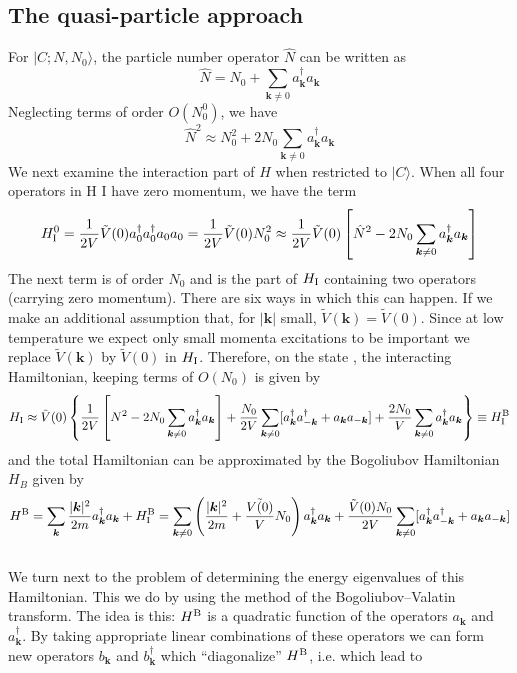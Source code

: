 \subsection{The quasi-particle approach}
For $|C;N,N_0\rangle$, the particle number operator $\hat{N}$ can be written as
\[\hat{N} = N_0 + \sum_{\bm{k}\neq 0}a_{\bm{k}}^{\dagger} a_{\bm{k}} \]
Neglecting terms of order $O(N_0^0)$, we have
\[\hat{N}^2 \approx N_0^2 + 2N_0\sum_{\bm{k}\neq 0}a_{\bm{k}}^{\dagger} a_{\bm{k}} \]
We next examine the interaction part of $H$ when restricted to $|C\rangle$. When all four operators in H I have zero momentum, we have the term
\[H_{\rm I}^0 = \frac{1}{2V} \tilde{V}(0) a^{\dagger}_{0} a^{\dagger}_{0} a_{0} a_{0} = \frac{1}{2V}\tilde{V}(0)N_0^2 \approx  \frac{1}{2V}\tilde{V}(0) \left[\hat{N}^2-2N_0\sum_{\bm{k}\neq 0}a_{\bm{k}}^{\dagger} a_{\bm{k}} \right]\]
The next term is of order $N_0$ and is the part of $H_{\rm I}$ containing two operators (carrying zero momentum). There are six ways in which this can happen. If we make an additional assumption that, for $|\bm{k}|$ small, $\tilde{V}(\bm{k}) = \tilde{V}(0)$. 
Since at low temperature we expect only small momenta excitations to be important we replace $\tilde{V}(\bm{k})$ by $\tilde{V}(0)$ in $H_{\rm I}$. Therefore, on the state , the interacting Hamiltonian, keeping terms of $O(N_0)$ is given by
\[H_{\rm I} \approx \tilde{V}(0) \left\{ \frac{1}{2V}\left[N^2-2N_0\sum_{\bm{k}\neq 0}a_{\bm{k}}^{\dagger} a_{\bm{k}} \right]  +\frac{N_0}{2V}\sum_{\bm{k}\neq 0} [a^{\dagger}_{\bm{k}} a^{\dagger}_{-\bm{k}} + a_{\bm{k}} a_{-\bm{k}}] +\frac{2N_0}{V} \sum_{\bm{k}\neq 0}a_{\bm{k}}^{\dagger} a_{\bm{k}} \right\} \equiv H_{\rm I}^{\rm B} \] 
and the total Hamiltonian can be approximated by the Bogoliubov Hamiltonian $H_B$ given by
\[H^{\rm B} = \sum_{\bm{k}} \frac{|\bm{k}|^2}{2m} a_{\bm{k}}^{\dagger} a_{\bm{k}} + H_{\rm I}^{\rm B} = \sum_{\bm{k}\neq 0} \left(\frac{|\bm{k}|^2}{2m} + \frac{\tilde{V(0)}}{V}N_0 \right)a_{\bm{k}}^{\dagger} a_{\bm{k}}  + \frac{\tilde{V}(0)N_0}{2V} \sum_{\bm{k}\neq 0} [a^{\dagger}_{\bm{k}} a^{\dagger}_{-\bm{k}} + a_{\bm{k}} a_{-\bm{k}}]\]
\\
We turn next to the problem of determining the energy eigenvalues of this Hamiltonian. This we do by using the method of the Bogoliubov–Valatin transform. 
The idea is this: $H^{\rm B}$ is a quadratic function of the operators $a_{\bm{k}}$ and $a^{\dagger}_{\bm{k}}$. 
By taking appropriate linear combinations of these operators we can form new operators $b_{\bm{k}}$ and $b^{\dagger}_{\bm{k}}$ which ``diagonalize'' $H^{\rm B}$, i.e. which lead to
